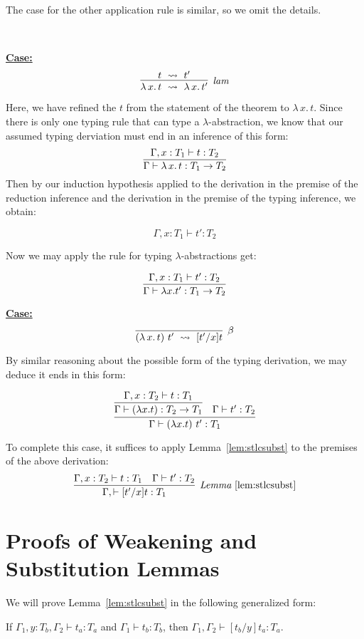\documentclass{article}
\providecommand{\betarule}[0]{\infer[\beta]{(\lambda\,x.\, t)\ t'\ \leadsto\ [t'/x]t}
                                {\ }}
\providecommand{\lamrule}[0]{\infer[\textit{lam}]{\lambda\,x.\, t\ \leadsto\ \lambda\,x.\, t'}
                               {t\ \leadsto\ t'}}
\begin{document}
\noindent The case for the other application rule is similar, so we omit the details.

\ 

\noindent \underline{\textbf{Case:}}
\[
\lamrule
\]

\noindent Here, we have refined the $t$ from the statement of the theorem
to $\lambda\,x.\, t$.  Since there is only one typing rule that can type
a $\lambda$-abstraction, we know that our assumed typing derviation must
end in an inference of this form:
\[ 
\infer{\Gamma\vdash \lambda\,x.\,t : T_1 \to T_2}
      {\Gamma,x:T_1\vdash t:T_2}
\]
\noindent Then by our induction hypothesis applied to the derivation in
the premise of the reduction inference and the derivation in the premise
of the typing inference, we obtain:

\[ 
\Gamma, x:T_1 \vdash t' : T_2
\]
       
\noindent Now we may apply the rule for typing $\lambda$-abstractions get:

\[
\infer{\Gamma \vdash \lambda x. t' : T_1 \to T_2}
{\Gamma, x:T_1 \vdash t' : T_2}
\]

\noindent \underline{\textbf{Case:}}
\[ 
\betarule
\]

\noindent By similar reasoning about the possible form of the typing derivation, we may deduce
it ends in this form:

\[ 
\infer{\Gamma \vdash (\lambda x.t)\ t' : T_1}
       {\infer{\Gamma \vdash (\lambda x.t) : T_2\to T_1}
              {\Gamma, x : T_2 \vdash t : T_1} & \Gamma \vdash t' : T_2}
\]

\noindent To complete this case, it suffices to apply 
Lemma~\ref{lem:stlcsubst} to the premises of the above derivation:
\[
\infer[\textit{Lemma}~\ref{lem:stlcsubst}]
      {\Gamma,\vdash [t'/x]t:T_1}
      {\Gamma, x : T_2 \vdash t : T_1 & \Gamma \vdash t' : T_2}
\]


\section{Proofs of Weakening and Substitution Lemmas}
\label{sec:stlcsubst}

We will prove Lemma~\ref{lem:stlcsubst} in the following generalized form:
\begin{lemma}[Substitution]
\label{lem:stlcsubsta}
If $\Gamma_1, y:T_b, \Gamma_2 \vdash t_a : T_a$ and $\Gamma_1 \vdash t_b : T_b$, then
$\Gamma_1,\Gamma_2 \vdash [t_b/y]t_a : T_a$.
\end{lemma}
\end{document}
